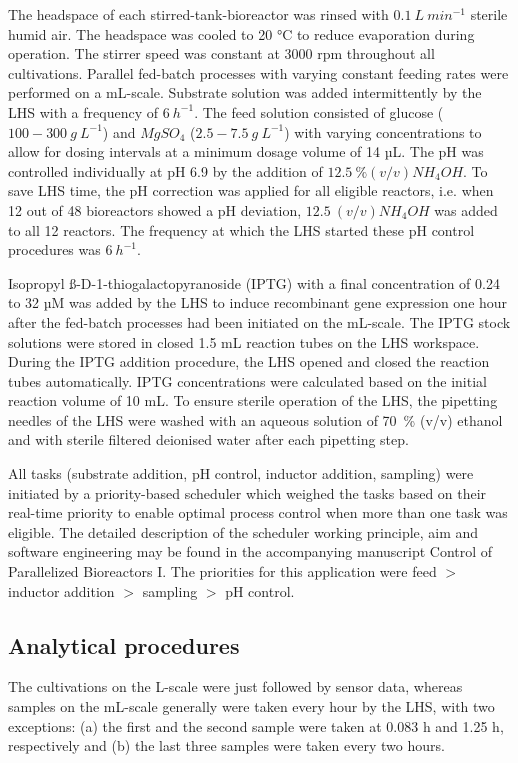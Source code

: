 \documentclass[sn-standardnature]{sn-jnl}%
\theoremstyle{thmstyleone}%
\theoremstyle{thmstyletwo}%
\theoremstyle{thmstylethree}%
\begin{document}
The headspace of each stirred-tank-bioreactor was rinsed with $0.1\ L\ min^{-1}$ sterile humid air.
The headspace was cooled to 20 °C to reduce evaporation during operation.
The stirrer speed was constant at 3000 rpm throughout all cultivations.
Parallel fed-batch processes with varying constant feeding rates were performed on a mL-scale.
Substrate solution was added intermittently by the LHS with a frequency of $6\ h^{-1}$.
The feed solution consisted of glucose ($100 - 300\ g\ L^{-1}$) and $MgSO_{4}$ ($2.5 - 7.5\ g\ L^{-1}$) with varying concentrations to allow for dosing intervals at a minimum dosage volume of 14 µL.
The pH was controlled individually at pH 6.9 by the addition of $12.5\ \% (v/v) NH_{4}OH$.
To save LHS time, the pH correction was applied for all eligible reactors, i.e. when 12 out of 48 bioreactors showed a pH deviation, $12.5\ (v/v) NH_{4}OH$ was added to all 12 reactors.
The frequency at which the LHS started these pH control procedures was $6\ h^{-1}$.

Isopropyl ß-D-1-thiogalactopyranoside (IPTG) with a final concentration of 0.24 to 32 µM was added by the LHS to induce recombinant gene expression one hour after the fed-batch processes had been initiated on the mL-scale.
The IPTG stock solutions were stored in closed 1.5 mL reaction tubes on the LHS workspace.
During the IPTG addition procedure, the LHS opened and closed the reaction tubes automatically.
IPTG concentrations were calculated based on the initial reaction volume of 10 mL.
To ensure sterile operation of the LHS, the pipetting needles of the LHS were washed with an aqueous solution of 70~\% (v/v) ethanol and with sterile filtered deionised water after each pipetting step.

All tasks (substrate addition, pH control, inductor addition, sampling) were initiated by a priority-based scheduler which weighed the tasks based on their real-time priority to enable optimal process control when more than one task was eligible.
The detailed description of the scheduler working principle, aim and software engineering may be found in the accompanying manuscript Control of Parallelized Bioreactors I.
The priorities for this application were feed $>$ inductor addition $>$ sampling $>$ pH control.

\subsection{Analytical procedures}
The cultivations on the L-scale were just followed by sensor data, whereas samples on the mL-scale generally were taken every hour by the LHS, with two exceptions:
(a) the first and the second sample were taken at 0.083 h and 1.25 h, respectively and (b) the last three samples were taken every two hours.
\end{document}
